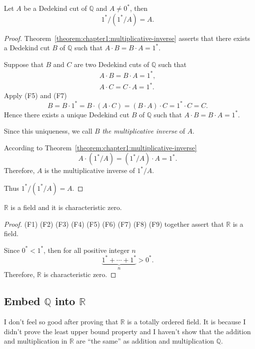\begin{theorem}
    Let $A$ be a Dedekind cut of $\mathbb{Q}$ and $A\ne {0}^{*}$, then
    \[
        {1}^{*}/({1}^{*}/A) = A.
    \]
\end{theorem}

\begin{proof}
    Theorem~\ref{theorem:chapter1:multiplicative-inverse} asserts that there exists a Dedekind cut $B$ of $\mathbb{Q}$ such that $A\cdot B = B\cdot A = {1}^{*}$.

    Suppose that $B$ and $C$ are two Dedekind cuts of $\mathbb{Q}$ such that
    \[
        \begin{split}
            A\cdot B = B\cdot A = {1}^{*}, \\
            A\cdot C = C\cdot A = {1}^{*}.
        \end{split}
    \]
    Apply (F5) and (F7)
    \[
        B = B\cdot {1}^{*} = B\cdot (A\cdot C) = (B\cdot A)\cdot C = {1}^{*}\cdot C = C.
    \]
    Hence there exists a unique Dedekind cut $B$ of $\mathbb{Q}$ such that $A\cdot B = B\cdot A = {1}^{*}$.

    Since this uniqueness, we call $B$ \textit{the multiplicative inverse} of $A$.

    According to Theorem~\ref{theorem:chapter1:multiplicative-inverse}
    \[
        A\cdot ({1}^{*}/A) = ({1}^{*}/A)\cdot A = {1}^{*}.
    \]
    Therefore, $A$ is the multiplicative inverse of ${1}^{*}/A$.

    Thus ${1}^{*}/({1}^{*}/A) = A$.
\end{proof}

\begin{theorem}
    $\mathbb{R}$ is a field and it is characteristic zero.
\end{theorem}

\begin{proof}
    (F1) (F2) (F3) (F4) (F5) (F6) (F7) (F8) (F9) together assert that $\mathbb{R}$ is a field.

    Since ${0}^{*} < {1}^{*}$, then for all positive integer $n$
    \[
        \underbrace{{1}^{*} + \cdots + {1}^{*}}_{n} > {0}^{*}.
    \]
    Therefore, $\mathbb{R}$ is characteristic zero.
\end{proof}

\subsection{Embed $\mathbb{Q}$ into $\mathbb{R}$}

I don't feel so good after proving that $\mathbb{R}$ is a totally ordered field. It is because I didn't prove the least upper bound property and I haven't show that the addition and multiplication in $\mathbb{R}$ are ``the same'' as addition and multiplication $\mathbb{Q}$.

